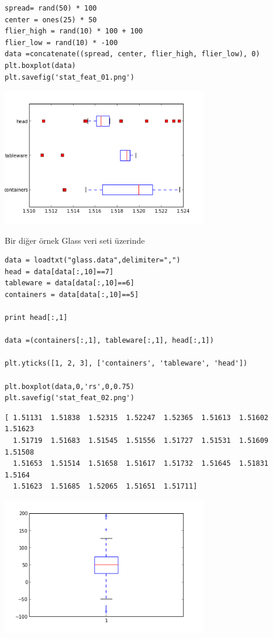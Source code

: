 \documentclass[12pt,fleqn]{article}\usepackage{../../common}
\begin{document}
\begin{verbatim}
spread= rand(50) * 100
center = ones(25) * 50
flier_high = rand(10) * 100 + 100
flier_low = rand(10) * -100
data =concatenate((spread, center, flier_high, flier_low), 0)
plt.boxplot(data)
plt.savefig('stat_feat_01.png')
\end{verbatim}

\includegraphics[height=6cm]{stat_feat_01.png}

Bir diğer örnek Glass veri seti üzerinde

\begin{verbatim}
data = loadtxt("glass.data",delimiter=",")
head = data[data[:,10]==7]
tableware = data[data[:,10]==6]
containers = data[data[:,10]==5]

print head[:,1]

data =(containers[:,1], tableware[:,1], head[:,1])

plt.yticks([1, 2, 3], ['containers', 'tableware', 'head'])

plt.boxplot(data,0,'rs',0,0.75)
plt.savefig('stat_feat_02.png')
\end{verbatim}

\begin{verbatim}
[ 1.51131  1.51838  1.52315  1.52247  1.52365  1.51613  1.51602  1.51623
  1.51719  1.51683  1.51545  1.51556  1.51727  1.51531  1.51609  1.51508
  1.51653  1.51514  1.51658  1.51617  1.51732  1.51645  1.51831  1.5164
  1.51623  1.51685  1.52065  1.51651  1.51711]
\end{verbatim}

\includegraphics[height=6cm]{stat_feat_02.png}
\end{document}
